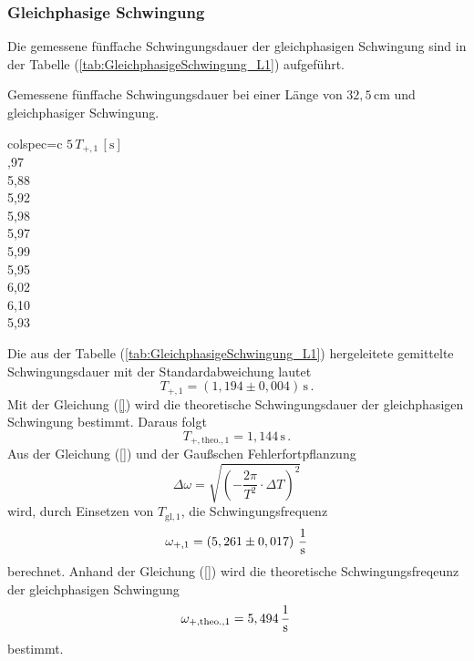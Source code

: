 \subsubsection{Gleichphasige Schwingung}
\label{sec:GleichphasigeSchwingung_KuresPendel}
Die gemessene fünffache Schwingungsdauer der gleichphasigen Schwingung sind in der Tabelle (\ref{tab:GleichphasigeSchwingung_L1}) aufgeführt.
\begin{table}[H]
  \centering
  \caption{Gemessene fünffache Schwingungsdauer bei einer Länge von $32,5\, \unit{\centi\meter}$ und gleichphasiger Schwingung.}
  \label{tab:GleichphasigeSchwingung_L1}
  \begin{tblr}{colspec={c}}
      \toprule
      $5\, T_{+, 1}\,\left[\unit{\second}\right]$\\
      ,97 \\
      5,88 \\
      5,92 \\
      5,98 \\
      5,97 \\
      5,99 \\
      5,95 \\
      6,02 \\
      6,10 \\
      5,93 \\
      \bottomrule
  \end{tblr}
\end{table}
Die aus der Tabelle (\ref{tab:GleichphasigeSchwingung_L1}) hergeleitete gemittelte Schwingungsdauer mit der Standardabweichung lautet
$$T_{+, 1} = \left( 1,194 \pm 0,004 \right)\,\unit{\second}\,.$$
Mit der Gleichung (\ref{}) wird die theoretische Schwingungsdauer der gleichphasigen Schwingung bestimmt. Daraus folgt
$$T_{+, \text{theo.}, 1} = 1,144\,\unit{\second}\,.$$
Aus der Gleichung (\ref{}) und der Gaußschen Fehlerfortpflanzung 
$$\Delta \omega = \sqrt{\left(-\frac{2 \pi}{T^{2}}\cdot \Delta T \right)^{2}}$$
wird, durch Einsetzen von $T_{\text{gl}, 1}$, die Schwingungsfrequenz
$$\omega_{+, 1} =  \left( 5,261 \pm 0,017 \right)\,\unit[per-mode=fraction]{\per \second}$$ berechnet. 
Anhand der Gleichung (\ref{}) wird die theoretische Schwingungsfreqeunz der gleichphasigen Schwingung 
$$\omega_{+, \text{theo.}, 1} = 5,494\,\unit[per-mode=fraction]{\per \second}\,$$ bestimmt.
%
%
